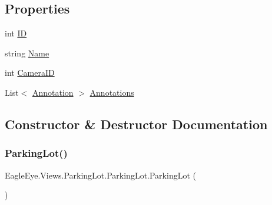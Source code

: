 \subsection*{Properties}
\begin{DoxyCompactItemize}
\item 
int \mbox{\hyperlink{class_eagle_eye_1_1_views_1_1_parking_lot_1_1_parking_lot_a577b278535b3599ca2aeb7ad17232f76}{ID}}
\item 
string \mbox{\hyperlink{class_eagle_eye_1_1_views_1_1_parking_lot_1_1_parking_lot_afad744515e8684f99befb40034fda405}{Name}}
\item 
int \mbox{\hyperlink{class_eagle_eye_1_1_views_1_1_parking_lot_1_1_parking_lot_afaaf127e901804b29115875ae66a9e6a}{Camera\+ID}}
\item 
List$<$ \mbox{\hyperlink{class_eagle_eye_1_1_views_1_1_parking_lot_1_1_annotation}{Annotation}} $>$ \mbox{\hyperlink{class_eagle_eye_1_1_views_1_1_parking_lot_1_1_parking_lot_a3ce10bda7806c9dcde5a9d0b3c2f2ad7}{Annotations}}
\end{DoxyCompactItemize}


\subsection{Constructor \& Destructor Documentation}
\mbox{\label{class_eagle_eye_1_1_views_1_1_parking_lot_1_1_parking_lot_ab1048c32ed1b8cfa5e06f8cd9f614e03}} 
\subsubsection{\texorpdfstring{ParkingLot()}{ParkingLot()}\hspace{0.1cm}{\footnotesize\ttfamily [1/2]}}
{\footnotesize\ttfamily Eagle\+Eye.\+Views.\+Parking\+Lot.\+Parking\+Lot.\+Parking\+Lot (\begin{DoxyParamCaption}{ }\end{DoxyParamCaption})}

